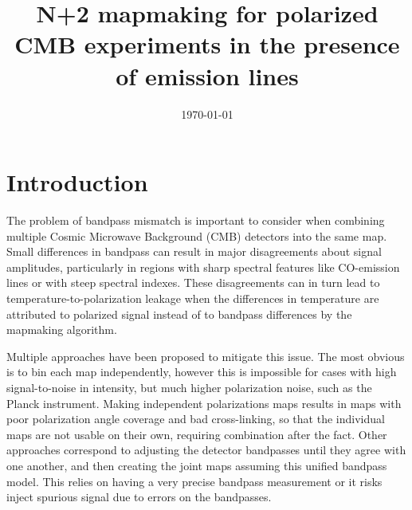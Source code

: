 \documentclass{aa}
\begin{document}
 


   \title{N+2 mapmaking for polarized CMB experiments in the presence of emission lines}

   

  

   \date{\today} 
   
   
   \maketitle
   
\section{Introduction}

The problem of bandpass mismatch is important to consider when combining multiple Cosmic Microwave Background (CMB) detectors into the same map. Small differences in bandpass can result in major disagreements about signal amplitudes, particularly in regions with sharp spectral features like CO-emission lines or with steep spectral indexes. These disagreements can in turn lead to temperature-to-polarization leakage when the differences in temperature are attributed to polarized signal instead of to bandpass differences by the mapmaking algorithm. 

Multiple approaches have been proposed to mitigate this issue. The most obvious is to bin each map independently, however this is impossible for cases with high signal-to-noise in intensity, but much higher polarization noise, such as the Planck instrument. Making independent polarizations maps results in maps with poor polarization angle coverage and bad cross-linking, so that the individual maps are not usable on their own, requiring combination after the fact. Other approaches correspond to adjusting the detector bandpasses until they agree with one another, and then creating the joint maps assuming this unified bandpass model. This relies on having a very precise bandpass measurement or it risks inject spurious signal due to errors on the bandpasses.
\end{document}
